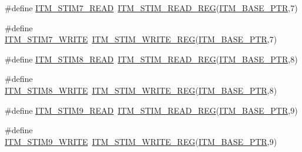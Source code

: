 \begin{DoxyCompactItemize}
\item 
\#define \hyperlink{group___i_t_m___register___accessor___macros_gad3fb2b38ef6a9727bd3036cf014f3d61}{I\+T\+M\+\_\+\+S\+T\+I\+M7\+\_\+\+R\+E\+AD}~\hyperlink{group___i_t_m___register___accessor___macros_ga5009882336aadcd4f37b45cf3395c450}{I\+T\+M\+\_\+\+S\+T\+I\+M\+\_\+\+R\+E\+A\+D\+\_\+\+R\+EG}(\hyperlink{group___i_t_m___peripheral_gafaddee8fe8b6a898d4e5edc43ee0d703}{I\+T\+M\+\_\+\+B\+A\+S\+E\+\_\+\+P\+TR},7)
\item 
\#define \hyperlink{group___i_t_m___register___accessor___macros_ga5a34eadd8072ebc43f50398cb76171af}{I\+T\+M\+\_\+\+S\+T\+I\+M7\+\_\+\+W\+R\+I\+TE}~\hyperlink{group___i_t_m___register___accessor___macros_ga049ca92a4e78e77c19af81e51aa73f1c}{I\+T\+M\+\_\+\+S\+T\+I\+M\+\_\+\+W\+R\+I\+T\+E\+\_\+\+R\+EG}(\hyperlink{group___i_t_m___peripheral_gafaddee8fe8b6a898d4e5edc43ee0d703}{I\+T\+M\+\_\+\+B\+A\+S\+E\+\_\+\+P\+TR},7)
\item 
\#define \hyperlink{group___i_t_m___register___accessor___macros_ga84e344ea9bb6dd044130f918d1cd3f59}{I\+T\+M\+\_\+\+S\+T\+I\+M8\+\_\+\+R\+E\+AD}~\hyperlink{group___i_t_m___register___accessor___macros_ga5009882336aadcd4f37b45cf3395c450}{I\+T\+M\+\_\+\+S\+T\+I\+M\+\_\+\+R\+E\+A\+D\+\_\+\+R\+EG}(\hyperlink{group___i_t_m___peripheral_gafaddee8fe8b6a898d4e5edc43ee0d703}{I\+T\+M\+\_\+\+B\+A\+S\+E\+\_\+\+P\+TR},8)
\item 
\#define \hyperlink{group___i_t_m___register___accessor___macros_ga90288fe5645ad72d65bcf25a4e48cc23}{I\+T\+M\+\_\+\+S\+T\+I\+M8\+\_\+\+W\+R\+I\+TE}~\hyperlink{group___i_t_m___register___accessor___macros_ga049ca92a4e78e77c19af81e51aa73f1c}{I\+T\+M\+\_\+\+S\+T\+I\+M\+\_\+\+W\+R\+I\+T\+E\+\_\+\+R\+EG}(\hyperlink{group___i_t_m___peripheral_gafaddee8fe8b6a898d4e5edc43ee0d703}{I\+T\+M\+\_\+\+B\+A\+S\+E\+\_\+\+P\+TR},8)
\item 
\#define \hyperlink{group___i_t_m___register___accessor___macros_ga1c080ae3f53ea5063b86fd6fe6ba264d}{I\+T\+M\+\_\+\+S\+T\+I\+M9\+\_\+\+R\+E\+AD}~\hyperlink{group___i_t_m___register___accessor___macros_ga5009882336aadcd4f37b45cf3395c450}{I\+T\+M\+\_\+\+S\+T\+I\+M\+\_\+\+R\+E\+A\+D\+\_\+\+R\+EG}(\hyperlink{group___i_t_m___peripheral_gafaddee8fe8b6a898d4e5edc43ee0d703}{I\+T\+M\+\_\+\+B\+A\+S\+E\+\_\+\+P\+TR},9)
\item 
\#define \hyperlink{group___i_t_m___register___accessor___macros_gaff1a7b2832a1e4ecef1e171dd126fc48}{I\+T\+M\+\_\+\+S\+T\+I\+M9\+\_\+\+W\+R\+I\+TE}~\hyperlink{group___i_t_m___register___accessor___macros_ga049ca92a4e78e77c19af81e51aa73f1c}{I\+T\+M\+\_\+\+S\+T\+I\+M\+\_\+\+W\+R\+I\+T\+E\+\_\+\+R\+EG}(\hyperlink{group___i_t_m___peripheral_gafaddee8fe8b6a898d4e5edc43ee0d703}{I\+T\+M\+\_\+\+B\+A\+S\+E\+\_\+\+P\+TR},9)

\end{DoxyCompactItemize}
